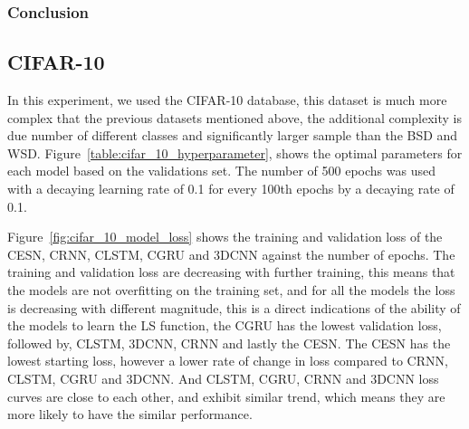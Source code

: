 \documentclass{WitsPhysicsReport}
\begin{document}
\subsubsection{Conclusion}

\newpage


\subsection{CIFAR-10}

In this experiment, we used the CIFAR-10 database, this dataset is much more complex that the previous datasets mentioned above, the additional complexity is due number of different classes and significantly larger sample than the BSD and WSD. Figure~\ref{table:cifar_10_hyperparameter}, shows the optimal parameters for each model based on the validations set. The number of 500 epochs was used with a decaying learning rate of 0.1 for every 100th epochs by a decaying rate of 0.1.


\begin{table}[!htb]
    \centering
        \caption{CIFAR-10 dataset optimal parameters for the CESN, CRNN, CLSTM, CGRU and 3DCNN}
    \label{table:cifar_10_hyperparameter}
\end{table}


Figure~\ref{fig:cifar_10_model_loss} shows the training and validation loss of the CESN, CRNN, CLSTM, CGRU and 3DCNN against the number of epochs. The training and validation loss are decreasing with further training, this means that the models are not overfitting on the training set, and for all the models the loss is decreasing with different magnitude, this is a direct indications of the ability of the models to learn the LS function, the CGRU has the lowest validation loss, followed by, CLSTM, 3DCNN, CRNN and lastly the CESN. The CESN has the lowest starting loss, however a lower rate of change in loss compared to CRNN, CLSTM, CGRU and 3DCNN. And CLSTM, CGRU, CRNN and 3DCNN loss curves are close to each other, and exhibit similar trend, which means they are more likely to have the similar performance.
\end{document}
